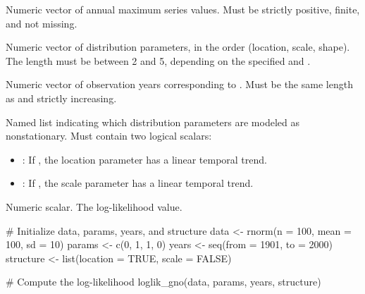 \documentclass[a4paper]{book}
\begin{document}
\begin{Arguments}
\begin{ldescription}
\item[\code{data}] Numeric vector of annual maximum series values.
Must be strictly positive, finite, and not missing.

\item[\code{params}] Numeric vector of distribution parameters, in the order (location,
scale, shape). The length must be between 2 and 5, depending on the specified
 and .

\item[\code{years}] Numeric vector of observation years corresponding to .
Must be the same length as  and strictly increasing.

\item[\code{structure}] Named list indicating which distribution parameters are
modeled as nonstationary. Must contain two logical scalars:
\begin{itemize}

\item{} : If , the location parameter has a linear temporal trend.
\item{} : If , the scale parameter has a linear temporal trend.

\end{itemize}

\end{ldescription}
\end{Arguments}
%
\begin{Value}
Numeric scalar. The log-likelihood value.
\end{Value}
%
\begin{SeeAlso}
\end{SeeAlso}
%
\begin{Examples}
\begin{ExampleCode}
# Initialize data, params, years, and structure
data <- rnorm(n = 100, mean = 100, sd = 10)
params <- c(0, 1, 1, 0)
years <- seq(from = 1901, to = 2000)
structure <- list(location = TRUE, scale = FALSE)

# Compute the log-likelihood
loglik_gno(data, params, years, structure)

\end{ExampleCode}
\end{Examples}
\end{document}
